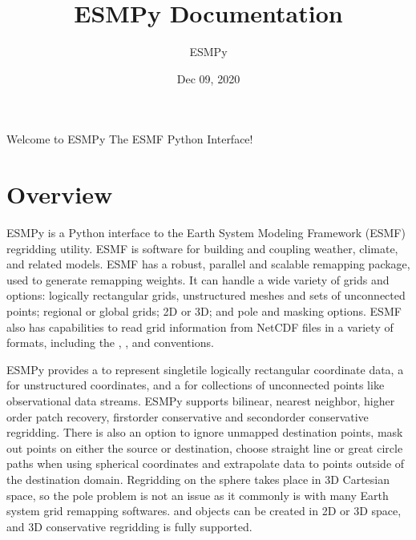 \documentclass[letterpaper,10pt,english]{sphinxmanual}
\title{ESMPy Documentation}
\date{Dec 09, 2020}
\author{ESMPy}
\begin{document}
\pagestyle{empty}
\sphinxmaketitle
\pagestyle{plain}
\sphinxtableofcontents
\pagestyle{normal}
\label{\detokenize{index::doc}}


Welcome to ESMPy \sphinxhyphen{} The ESMF Python Interface!


\chapter{Overview}
\label{\detokenize{intro:module-ESMF}}\label{\detokenize{intro:overview}}\label{\detokenize{intro::doc}}
ESMPy is a Python interface to the Earth System Modeling Framework (ESMF) 
regridding utility. ESMF is software for
building and coupling weather, climate, and related models. ESMF has a robust,
parallel and scalable remapping package, used to generate remapping weights.
It can handle a wide variety of grids and options: logically rectangular grids,
unstructured meshes and sets of unconnected points; regional or global grids;
2D or 3D; and pole and masking options. ESMF also has capabilities to read grid
information from NetCDF files in a variety of formats, including the
,
,
and
conventions.

ESMPy provides a {\hyperref[\detokenize{grid:ESMF.api.grid.Grid}]{}} to represent single\sphinxhyphen{}tile logically
rectangular coordinate data, a {\hyperref[\detokenize{mesh:ESMF.api.mesh.Mesh}]{}} for unstructured 
coordinates, and a {\hyperref[\detokenize{locstream:ESMF.api.locstream.LocStream}]{}} for collections of
unconnected points like observational data streams.
ESMPy supports bilinear, nearest neighbor, higher order patch recovery, 
first\sphinxhyphen{}order conservative and second\sphinxhyphen{}order conservative regridding. There is 
also an option to ignore unmapped destination points, mask out points on either
the source or destination, choose straight line or great circle paths when using
spherical coordinates and extrapolate data to points outside of the destination
domain. Regridding on the sphere takes place in 3D Cartesian space, so the pole
problem is not an issue as it commonly is with many Earth system grid remapping
softwares. {\hyperref[\detokenize{grid:ESMF.api.grid.Grid}]{}} and {\hyperref[\detokenize{mesh:ESMF.api.mesh.Mesh}]{}} 
objects can be created in 2D or 3D space, and 3D conservative regridding is 
fully supported.
\end{document}
